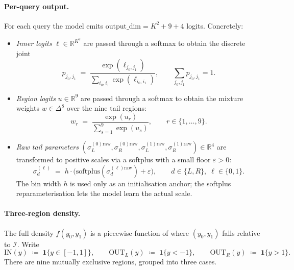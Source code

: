 \paragraph{Per-query output.}
For each query the model emits
$\mathrm{output\_dim} = K^{2} + 9 + 4$
logits. Concretely:
\begin{itemize}
\item \emph{Inner logits} $\ell \in \mathbb{R}^{K^{2}}$
  are passed through a softmax to obtain the discrete joint
  \begin{equation}
  p_{j_0, j_1} \;=\; \frac{\exp(\ell_{j_0, j_1})}
    {\sum_{i_0, i_1} \exp(\ell_{i_0, i_1})},
    \qquad
    \sum_{j_0, j_1} p_{j_0, j_1} = 1.
  \label{eq:pmat-softmax}
  \end{equation}

\item \emph{Region logits} $u \in \mathbb{R}^{9}$
  are passed through a softmax to obtain the mixture weights $w \in \Delta^{8}$
  over the nine tail regions:
  \begin{equation}
    w_r \;=\; \frac{\exp(u_r)}{\sum_{s=1}^{9} \exp(u_s)},
    \qquad r \in \{1,\dots,9\}.
  \label{eq:region-weights}
  \end{equation}

\item \emph{Raw tail parameters}
  $(\sigma_{L}^{(0)\text{raw}}, \sigma_{R}^{(0)\text{raw}},
    \sigma_{L}^{(1)\text{raw}}, \sigma_{R}^{(1)\text{raw}}) \in \mathbb{R}^{4}$
  are transformed to positive scales via a softplus with a small floor
  $\varepsilon > 0$:
  \begin{equation}
    \sigma_{d}^{(\ell)} \;=\; h \cdot
    \bigl(\mathrm{softplus}(\sigma_{d}^{(\ell)\text{raw}}) + \varepsilon\bigr),
    \qquad d \in \{L, R\},\; \ell \in \{0, 1\}.
  \label{eq:tail-scales}
  \end{equation}
  The bin width $h$ is used only as an initialisation anchor; the
  softplus reparameterisation lets the model learn the actual scale.
\end{itemize}

\paragraph{Three-region density.}
The full density $f(y_0, y_1)$ is a piecewise function of where
$(y_0, y_1)$ falls relative to $\mathcal{I}$. Write
\begin{equation}
\mathrm{IN}(y) \;\coloneqq\; \mathbf{1}\{y \in [-1, 1]\},\qquad
\mathrm{OUT}_{L}(y) \;\coloneqq\; \mathbf{1}\{y < -1\},\qquad
\mathrm{OUT}_{R}(y) \;\coloneqq\; \mathbf{1}\{y > 1\}.
\end{equation}
There are nine mutually exclusive regions, grouped into three cases.

